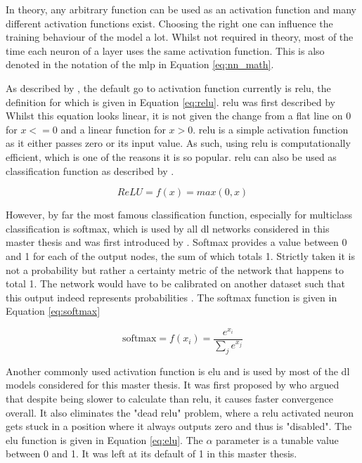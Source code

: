 In theory, any arbitrary function can be used as an activation function and many different activation functions exist.
Choosing the right one can influence the training behaviour of the model a lot.
Whilst not required in theory, most of the time each neuron of a layer uses the same activation function.
This is also denoted in the notation of the \gls{mlp} in Equation \ref{eq:nn_math}.

As described by \citet{dl_book}, the default go to activation function currently is \gls{relu}, the definition for which is given in Equation \ref{eq:relu}.
\gls{relu} was first described by \citet{first_relu}
Whilst this equation looks linear, it is not given the change from a flat line on $0$ for $x<=0$ and a linear function for $x>0$.
\gls{relu} is a simple activation function as it either passes zero or its input value.
As such, using \gls{relu} is computationally efficient, which is one of the reasons it is so popular.
\gls{relu} can also be used as classification function as described by \citet{relu_classi}.

\begin{equation}
    \label{eq:relu}
    ReLU = f(x) = max(0, x)
\end{equation}

However, by far the most famous classification function, especially for multiclass classification is softmax, which is used by all \gls{dl} networks considered in this master thesis and was first introduced by \citet{softmax}.
Softmax provides a value between 0 and 1 for each of the output nodes, the sum of which totals 1.
Strictly taken it is not a probability but rather a certainty metric of the network that happens to total 1.
The network would have to be calibrated on another dataset such that this output indeed represents probabilities \citep{softmcax_calibration}.
The softmax function is given in Equation \ref{eq:softmax}

\begin{equation}
    \label{eq:softmax}
    \text{softmax} = f(x_i) = \frac{e^{x_i}}{\sum_j e^{x_j}}
\end{equation}

Another commonly used activation function is \gls{elu} and is used by most of the \gls{dl} models considered for this master thesis.
It was first proposed by \citet{elu} who argued that despite being slower to calculate than \gls{relu}, it causes faster convergence overall.
It also eliminates the "dead \gls{relu}" problem, where a \gls{relu} activated neuron gets stuck in a position where it always outputs zero and thus is "disabled".
The \gls{elu} function is given in Equation \ref{eq:elu}.
The $\alpha$ parameter is a tunable value between 0 and 1.
It was left at its default of 1 in this master thesis.

